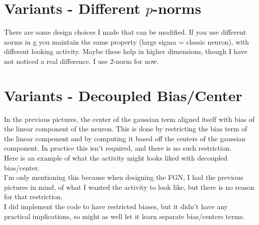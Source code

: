 \documentclass{article}
\begin{document}
\section{Variants - Different $p$-norms}
There are some design choices I made that can be modified. If you use different norms in g you maintain the same property (large sigma = classic neuron), with different looking activity. Maybe these help in higher dimensions, though I have not noticed a real difference. I use 2-norm for now.


\section{Variants - Decoupled Bias/Center}
In the previous pictures, the center of the gaussian term aligned itself with bias of the linear component of the neuron. This is done by restricting the bias term of the linear component and by computing it based off the centers of the gaussian component.  In practice this isn't required, and there is no such restriction.\\
Here is an example of what the activity might looks liked with decoupled bias/center.\\
I'm only mentioning this because when designing the FGN, I had the previous pictures in mind, of what I wanted the activity to look like, but there is no reason for that restriction. \\
I did implement the code to have restricted biases, but it didn't have any practical implications, so might as well let it learn separate bias/centers terms. 
\end{document}
